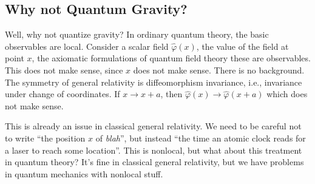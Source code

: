 \subsection{Why not Quantum Gravity?}

Well, why not quantize gravity? In ordinary quantum theory, the basic
observables are local.  Consider a scalar field $\widehat{\varphi}(x)$,
the value of the field at point $x$, the axiomatic formulations of
quantum field theory these are observables.  This does not make sense,
since $x$ does not make sense.  There is no background. The symmetry of
general relativity is diffeomorphism invariance, i.e., invariance under
change of coordinates.  If $x\to x+a$, then
$\widehat{\varphi}(x)\to\widehat{\varphi}(x+a)$ which does not make
sense.

This is already an issue in classical general relativity.  We need to be
careful not to write ``the position $x$ of \emph{blah}'', but instead
``the time an atomic clock reads for a laser to reach some location''.
This is nonlocal, but what about this treatment in quantum theory?  It's
fine in classical general relativity, but we have problems in quantum
mechanics with nonlocal stuff.
